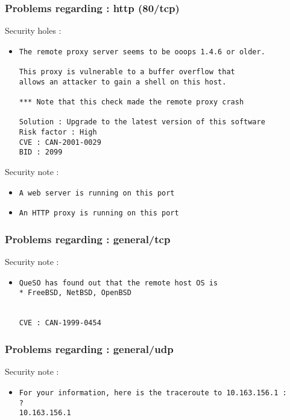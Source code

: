 \documentclass{article}
\begin{document}
\subsubsection{Problems regarding : http (80/tcp)}
Security holes :\\
\begin{itemize}
\item \begin{verbatim}
The remote proxy server seems to be ooops 1.4.6 or older.

This proxy is vulnerable to a buffer overflow that
allows an attacker to gain a shell on this host.

*** Note that this check made the remote proxy crash

Solution : Upgrade to the latest version of this software
Risk factor : High
CVE : CAN-2001-0029
BID : 2099
\end{verbatim}\end{itemize}
Security note :\\
\begin{itemize}
\item \begin{verbatim}
A web server is running on this port
\end{verbatim}\item \begin{verbatim}
An HTTP proxy is running on this port
\end{verbatim}\end{itemize}
\subsubsection{Problems regarding : general/tcp}
Security note :\\
\begin{itemize}
\item \begin{verbatim}
QueSO has found out that the remote host OS is 
* FreeBSD, NetBSD, OpenBSD  


CVE : CAN-1999-0454
\end{verbatim}\end{itemize}
\subsubsection{Problems regarding : general/udp}
Security note :\\
\begin{itemize}
\item \begin{verbatim}
For your information, here is the traceroute to 10.163.156.1 : 
?
10.163.156.1

\end{verbatim}\end{itemize}
\newpage
\end{document}
